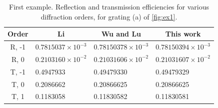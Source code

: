 \documentclass[reprint,amsmath,amssymb,
 aps]{revtex4-2}
\begin{document}
\begin{table}[h!]
\centering
\caption{First example. Reflection and transmission efficiencies for various diffraction orders, for grating (a) of \cref{fig:ex1}.}    
\begin{ruledtabular}
\begin{tabular}{clll}
Order & \multicolumn{1}{c}{Li \cite{li1993multilayer}}    & \multicolumn{1}{c}{Wu and Lu \cite{wu2009analyzing}} & \multicolumn{1}{c}{This work} \\ \hline
R, -1 & $0.7815037\times 10^{-3}$ & $0.78150378\times 10^{-3}$    & $0.78150394\times 10^{-3}$    \\
R, 0  & $0.2103160\times 10^{-2}$ & $0.21031606\times 10^{-2}$    & $0.21031607\times 10^{-2}$    \\
T, -1 & 0.4947933                 & 0.49479330                    & 0.49479329                    \\
T, 0  & 0.2086662                 & 0.20866625                    & 0.20866625                    \\
T, 1  & 0.1183058                 & 0.11830582                    & 0.11830581                   
\end{tabular}          
\end{ruledtabular}
\label{tab:ex1}
\end{table}
\end{document}
